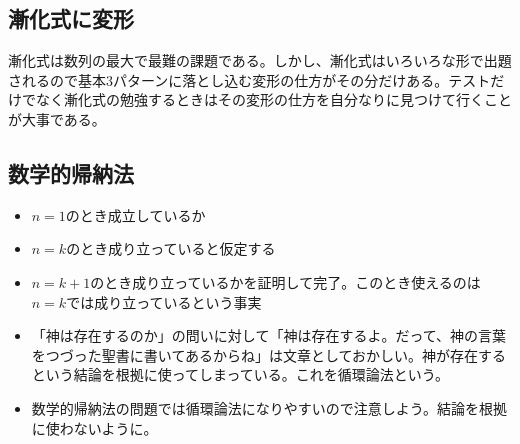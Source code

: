 \documentclass[twocolumn, 25pt]{jarticle}
\begin{document}
\subsection{漸化式に変形}
漸化式は数列の最大で最難の課題である。しかし、漸化式はいろいろな形で出題されるので基本$3$パターンに落とし込む変形の仕方がその分だけある。テストだけでなく漸化式の勉強するときはその変形の仕方を自分なりに見つけて行くことが大事である。
\subsection{数学的帰納法}
\begin{itemize}
  \item $n = 1$のとき成立しているか
  \item $n = k$のとき成り立っていると仮定する
  \item $n = k + 1$のとき成り立っているかを証明して完了。このとき使えるのは$n = k$では成り立っているという事実
  \item 「神は存在するのか」の問いに対して「神は存在するよ。だって、神の言葉をつづった聖書に書いてあるからね」は文章としておかしい。神が存在するという結論を根拠に使ってしまっている。これを循環論法という。
  \item 数学的帰納法の問題では循環論法になりやすいので注意しよう。結論を根拠に使わないように。
\end{itemize}
\end{document}
